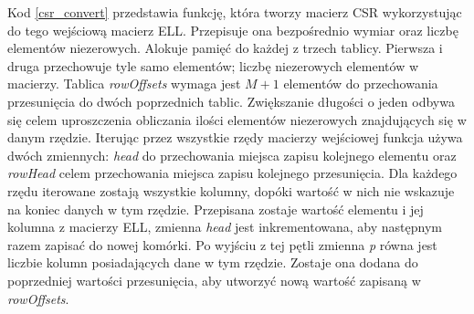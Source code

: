 Kod \ref{csr_convert} przedstawia funkcję, która tworzy macierz CSR wykorzystując do tego wejściową macierz ELL.
Przepisuje ona bezpośrednio wymiar oraz liczbę elementów niezerowych.
Alokuje pamięć do każdej z trzech tablicy.
Pierwsza i druga przechowuje tyle samo elementów; liczbę niezerowych elementów w macierzy.
Tablica \textit{rowOffsets} wymaga jest $M+1$ elementów do przechowania przesunięcia do dwóch poprzednich tablic.
Zwiększanie długości o jeden odbywa się celem uproszczenia obliczania ilości elementów niezerowych znajdujących się w danym rzędzie.
Iterując przez wszystkie rzędy macierzy wejściowej funkcja używa dwóch zmiennych: \textit{head} do przechowania miejsca zapisu kolejnego elementu oraz \textit{rowHead} celem przechowania miejsca zapisu kolejnego przesunięcia.
Dla każdego rzędu iterowane zostają wszystkie kolumny, dopóki wartość w nich nie wskazuje na koniec danych w tym rzędzie.
Przepisana zostaje wartość elementu i jej kolumna z macierzy ELL, zmienna \textit{head} jest inkrementowana, aby następnym razem zapisać do nowej komórki.
Po wyjściu z tej pętli zmienna \textit{p} równa jest liczbie kolumn posiadających dane w tym rzędzie. 
Zostaje ona dodana do poprzedniej wartości przesunięcia, aby utworzyć nową wartość zapisaną w \textit{rowOffsets}.


